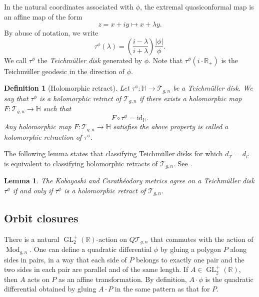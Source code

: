 \documentclass[11pt]{amsart}
\theoremstyle{plain}
\newtheorem{Definition}[Theorem]{Definition}
\newtheorem{Lemma}[Theorem]{Lemma}
\newcommand{\Tei}{\mathcal{T}}
\newcommand{\HP}{\mathbb{H}}
\begin{document}
In the natural coordinates associated with $\phi$, the extremal quasiconformal map is 
an affine map of the form $$z=x+iy \mapsto  x+\lambda y.$$ 
By abuse of notation, we write $$\tau^{\phi}(\lambda)=\left( \frac{i-\lambda}{i+\lambda}  \right) \frac{|\phi|}{\phi}.$$ 
We call $\tau^{\phi}$ the \emph{Teichm\"{u}ller disk} generated by $\phi$.
Note that $\tau^\phi\left( i \cdot \mathbb{R}_+ \right)$ is the Teichm\"uller geodesic
in the direction of $\phi$.


\begin{Definition}[Holomorphic retract]
  Let $\tau^\phi: \HP \rightarrow \Tei_{g,n}$ be a Teichm\"uller disk. 
We say that $\tau^{\phi}$ is a \emph{holomorphic retract} of $\Tei_{g,n}$ if 
there exists a holomorphic map $F : \Tei_{g,n} \to \HP$ such that $$F\circ \tau^\phi=\mathrm{id}_\HP.$$
Any holomorphic map  $F : \Tei_{g,n} \to \HP$ satisfies the above property is called a holomorphic retraction of $\tau^\phi$.
\end{Definition}

The following lemma states that classifying Teichm\"uller disks for which $d_\Tei = d_\mathcal{C}$ is equivalent to classifying holomorphic retracts of $\Tei_{g,n}$.
See \cite[Lemma 1.3]{GM2020}.
\begin{Lemma}
 The Kobayashi and Carath\'{e}odory metrics agree on a Teichm\"{u}ller disk $\tau^{\phi}$ if and only if $\tau^{\phi}$ is a holomorphic retract of $\Tei_{g,n}$.
\end{Lemma}





\subsection{Orbit closures}


There is a natural $\operatorname{GL}_2^+(\mathbb{R})$-action on $Q\Tei_{g,n}$ 
that commutes with 
the action of $\operatorname{Mod}_{g,n}$.  One can define a quadratic differential
$\phi$ by gluing a polygon $P$ along sides in pairs, in a way that each side of $P$
belongs to exactly one pair and the two sides in each pair are parallel and of the
same length. If $A\in \operatorname{GL}_2^+(\mathbb{R})$, then $A$ acts on $P$
as an affine transformation. By definition,  $A \cdot \phi$ is the quadratic differential obtained by gluing $A\cdot P$ in the same pattern as that for $P$. 
\end{document}
